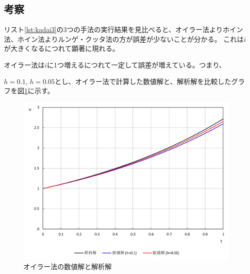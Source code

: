 \documentclass[a4j,titlepage]{jsarticle}
\begin{document}
\subsection{考察}
リスト\ref{lst:kadai3}の3つの手法の実行結果を見比べると、オイラー法よりホイン法、ホイン法よりルンゲ・クッタ法の方が誤差が少ないことが分かる。
これは$i$が大きくなるにつれて顕著に現れる。

オイラー法は$i$に1つ増えるにつれて一定して誤差が増えている。つまり、

$h = 0.1$, $h = 0.05$とし、オイラー法で計算した数値解と、解析解を比較したグラフを図\ref{fig:kadai3}に示す。


\begin{figure}[H]
  \centering
  \includegraphics[width=15cm]{kadai3.png}
  \caption{オイラー法の数値解と解析解}
  \label{fig:kadai3}
\end{figure}
\end{document}

